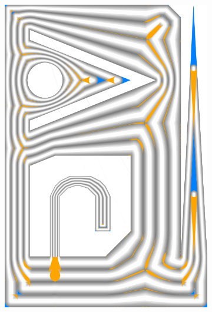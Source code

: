 \begin{figure}
\begin{subfigure}{\figwidth}
\includegraphics[height=\figheight]{sources-validation-gMAT-example-TEST-Constant-accuracy.png}

\end{subfigure}
\end{figure}

